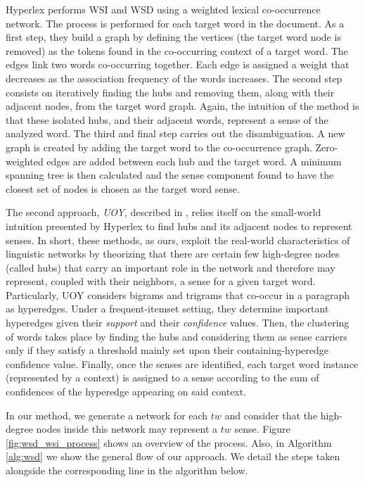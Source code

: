 Hyperlex performs WSI and WSD using a weighted lexical co-occurrence network. The process is performed for each target word in the document. As a first step, they build a  graph by defining the vertices (the target word node is removed) as the tokens found in the  co-occurring  context of a target word. The edges link two words co-occurring together. Each edge is assigned a weight that decreases as the association frequency of the words increases. The second step consists on iteratively finding the hubs and removing them, along with their adjacent nodes, from the target word graph. Again, the intuition of the method is that these isolated hubs, and their adjacent words, represent a sense of the analyzed word. The third and final step carries out the disambiguation. A new graph is created by adding the target word to the co-occurrence graph. Zero-weighted edges are added between each hub and the target word. A minimum spanning tree is then calculated and the sense component found to have the closest set of nodes is chosen as the target word sense.

The second approach, \textit{UOY}, described in \cite{2007.Klapaftis.UOY},  relies itself on the small-world intuition presented  by Hyperlex to find hubs and its adjacent nodes to represent senses.   In short, these methods, as ours, exploit the real-world characteristics of linguistic networks by theorizing that there are certain few high-degree nodes (called hubs) that carry an important role in the network and therefore may represent, coupled with their neighbors, a sense for a given target word. Particularly, UOY considers bigrams and trigrams that co-occur in a paragraph as hyperedges. Under a frequent-itemset setting, they determine important hyperedges given their \textit{support} and their \textit{confidence}  values. Then, the clustering of words takes place by finding the hubs and considering them as sense carriers only if they satisfy a threshold mainly set upon their containing-hyperedge confidence value. Finally, once the senses are identified, each target word instance (represented by a context) is assigned to a sense according to the sum of confidences of the hyperedge appearing on said context. 

In our method, we generate a network for each $tw$ and consider that the high-degree nodes inside this network may represent a $tw$ sense. Figure \ref{fig:wsd_wsi_process}  shows an overview of the process. Also, in Algorithm \ref{alg:wsd} we show the general flow of our approach.  We detail the steps taken alongside the corresponding line in the algorithm below. 

